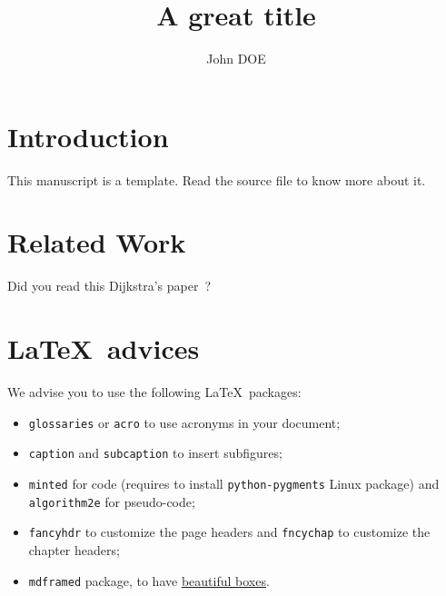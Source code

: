 \documentclass[twoside,12pt,a4paper]{book}
\author{John DOE}
\title{A great title}
\begin{document}
\frontmatter

  


\dominitoc %
\tableofcontents
\mtcaddchapter %

\listoffigures
\mtcaddchapter %

\listoftables
\mtcaddchapter %



\chapter{Introduction}

This manuscript is a template.
Read the source file to know more about it.


\mainmatter
\chapter{Related Work}
\label{sec:relatedWork}

Did you read this Dijkstra's paper~\cite{Ref1}?


\chapter{\LaTeX~advices}

We advise you to use the following \LaTeX~packages:
\begin{itemize}
\item \texttt{glossaries} or \texttt{acro} to use acronyms in your document;
\item \texttt{caption} and \texttt{subcaption} to insert subfigures;
\item \texttt{minted} for code (requires to install \texttt{python-pygments} Linux package)
  and \texttt{algorithm2e} for pseudo-code;
\item \texttt{fancyhdr} to customize the page headers and \texttt{fncychap} to customize the chapter headers;
\item \texttt{mdframed} package, to have \href{https://texblog.org/2015/09/30/fancy-boxes-for-theorem-lemma-and-proof-with-mdframed/}{beautiful boxes}.
\end{itemize}
\end{document}
